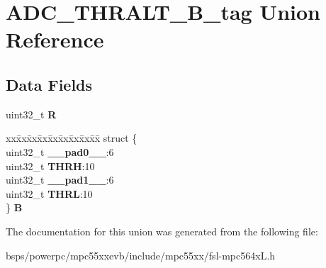 \hypertarget{unionADC__THRALT__32B__tag}{}\section{A\+D\+C\+\_\+\+T\+H\+R\+A\+L\+T\+\_\+B\+\_\+tag Union Reference}
\label{unionADC__THRALT__32B__tag}
\subsection*{Data Fields}
\begin{DoxyCompactItemize}
\item 
\mbox{\label{unionADC__THRALT__32B__tag_a4878ad47024c1ceedd8bc3637d5dcac7}} 
uint32\+\_\+t {\bfseries R}
\item 
\mbox{\label{unionADC__THRALT__32B__tag_a2ba5f5c9f2ca110ab8fe0389463650ee}} 
\begin{tabbing}
xx\=xx\=xx\=xx\=xx\=xx\=xx\=xx\=xx\=\kill
struct \{\\
\>uint32\_t {\bfseries \_\_pad0\_\_}:6\\
\>uint32\_t {\bfseries THRH}:10\\
\>uint32\_t {\bfseries \_\_pad1\_\_}:6\\
\>uint32\_t {\bfseries THRL}:10\\
\} {\bfseries B}\\

\end{tabbing}\end{DoxyCompactItemize}


The documentation for this union was generated from the following file\+:\begin{DoxyCompactItemize}
\item 
bsps/powerpc/mpc55xxevb/include/mpc55xx/fsl-\/mpc564x\+L.\+h\end{DoxyCompactItemize}
